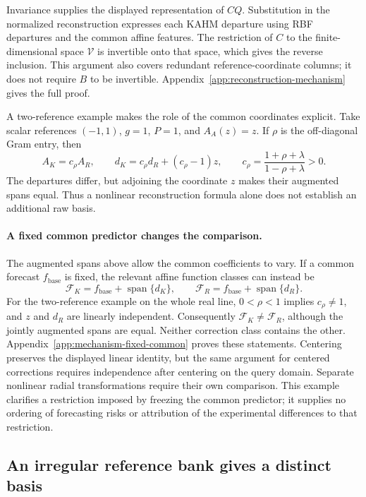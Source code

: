 Invariance supplies the displayed representation of $CQ$. Substitution
in the normalized reconstruction expresses each KAHM departure using
RBF departures and the common affine features. The restriction of $C$
to the finite-dimensional space $\mathcal V$ is invertible onto that
space, which gives the reverse inclusion. This argument also covers
redundant reference-coordinate columns; it does not require $B$ to be
invertible. Appendix~\ref{app:reconstruction-mechanism} gives the full
proof.

A two-reference example makes the role of the common coordinates
explicit. Take scalar references $(-1,1)$, $g=1$, $P=1$, and
$A_A(z)=z$. If $\rho$ is the off-diagonal Gram entry, then
\[
 A_K=c_\rho A_R,\qquad
 d_K=c_\rho d_R+(c_\rho-1)z,\qquad
 c_\rho=\frac{1+\rho+\lambda}{1-\rho+\lambda}>0.
\]
The departures differ, but adjoining the coordinate $z$ makes their
augmented spans equal. Thus a nonlinear reconstruction formula alone
does not establish an additional raw basis.

\paragraph{A fixed common predictor changes the comparison.}
The augmented spans above allow the common coefficients to vary. If a
common forecast $f_{\mathrm{base}}$ is fixed, the relevant affine
function classes can instead be
\begin{equation}
 \mathcal F_K=f_{\mathrm{base}}+\operatorname{span}\{d_K\},\qquad
 \mathcal F_R=f_{\mathrm{base}}+\operatorname{span}\{d_R\}.
 \label{eq:mechanism-fixed-common-classes}
\end{equation}
For the two-reference example on the whole real line, $0<\rho<1$
implies $c_\rho\ne1$, and $z$ and $d_R$ are linearly independent.
Consequently $\mathcal F_K\ne\mathcal F_R$, although the jointly
augmented spans are equal. Neither correction class contains the other.
Appendix~\ref{app:mechanism-fixed-common} proves these statements.
Centering preserves the displayed linear identity, but the same argument
for centered corrections requires independence after centering on the
query domain. Separate nonlinear radial transformations require their
own comparison. This example clarifies a restriction imposed by freezing
the common predictor; it supplies no ordering of forecasting risks or
attribution of the experimental differences to that restriction.

\subsection{An irregular reference bank gives a distinct basis}

